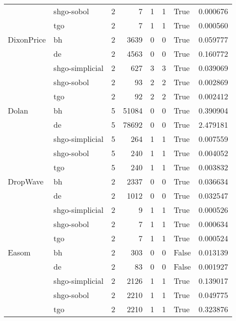 \begin{longtable}{llrrrrlr}
         & shgo-sobol &     2 &        7 &      1 &       1 &    True &    0.000676 \\
         & tgo &     2 &        7 &      1 &       1 &    True &    0.000560 \\
DixonPrice & bh &     2 &     3639 &      0 &       0 &    True &    0.059777 \\
         & de &     2 &     4563 &      0 &       0 &    True &    0.160772 \\
         & shgo-simplicial &     2 &      627 &      3 &       3 &    True &    0.039069 \\
         & shgo-sobol &     2 &       93 &      2 &       2 &    True &    0.002869 \\
         & tgo &     2 &       92 &      2 &       2 &    True &    0.002412 \\
Dolan & bh &     5 &    51084 &      0 &       0 &    True &    0.390904 \\
         & de &     5 &    78692 &      0 &       0 &    True &    2.479181 \\
         & shgo-simplicial &     5 &      264 &      1 &       1 &    True &    0.007559 \\
         & shgo-sobol &     5 &      240 &      1 &       1 &    True &    0.004052 \\
         & tgo &     5 &      240 &      1 &       1 &    True &    0.003832 \\
DropWave & bh &     2 &     2337 &      0 &       0 &    True &    0.036634 \\
         & de &     2 &     1012 &      0 &       0 &    True &    0.032547 \\
         & shgo-simplicial &     2 &        9 &      1 &       1 &    True &    0.000526 \\
         & shgo-sobol &     2 &        7 &      1 &       1 &    True &    0.000634 \\
         & tgo &     2 &        7 &      1 &       1 &    True &    0.000524 \\
Easom & bh &     2 &      303 &      0 &       0 &   False &    0.013139 \\
         & de &     2 &       83 &      0 &       0 &   False &    0.001927 \\
         & shgo-simplicial &     2 &     2126 &      1 &       1 &    True &    0.139017 \\
         & shgo-sobol &     2 &     2210 &      1 &       1 &    True &    0.049775 \\
         & tgo &     2 &     2210 &      1 &       1 &    True &    0.323876 \\

\end{longtable}
